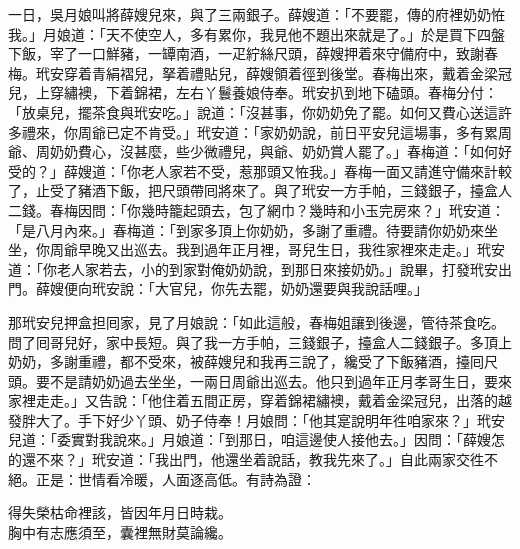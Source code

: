 一日，吳月娘叫將薛嫂兒來，與了三兩銀子。{}薛嫂道：「不要罷，傳的府裡奶奶恠我。」月娘道：「天不使空人，多有累你，我見他不題出來就是了。」於是買下四盤下飯，宰了一口鮮豬，一罈南酒，一疋紵絲尺頭，薛嫂押着來守備府中，致謝春梅。玳安穿着青絹褶兒，拏着禮貼兒，薛嫂領着徑到後堂。春梅出來，戴着金梁冠兒，上穿繡襖，下着錦裙，左右丫鬟養娘侍奉。玳安扒到地下磕頭。春梅分付：「放桌兒，擺茶食與玳安吃。」說道：「沒甚事，你奶奶免了罷。如何又費心送這許多禮來，你周爺已定不肯受。」玳安道：「家奶奶說，前日平安兒這場事，多有累周爺、周奶奶費心，沒甚麼，些少微禮兒，與爺、奶奶賞人罷了。」春梅道：「如何好受的？」薛嫂道：「你老人家若不受，惹那頭又恠我。」春梅一面又請進守備來計較了，止受了豬酒下飯，把尺頭帶囘將來了。與了玳安一方手帕，三錢銀子，擡盒人二錢。春梅因問：「你幾時籠起頭去，包了網巾？幾時和小玉完房來？」{}玳安道：「是八月內來。」春梅道：「到家多頂上你奶奶，多謝了重禮。待要請你奶奶來坐坐，你周爺早晚又出巡去。我到過年正月裡，哥兒生日，我徃家裡來走走。」玳安道：「你老人家若去，小的到家對俺奶奶說，到那日來接奶奶。」說畢，打發玳安出門。薛嫂便向玳安說：「大官兒，你先去罷，奶奶還要與我說話哩。」

那玳安兒押盒担囘家，見了月娘說：「如此這般，春梅姐讓到後邊，管待茶食吃。問了囘哥兒好，家中長短。與了我一方手帕，三錢銀子，擡盒人二錢銀子。多頂上奶奶，多謝重禮，都不受來，被薛嫂兒和我再三說了，纔受了下飯豬酒，擡囘尺頭。要不是請奶奶過去坐坐，一兩日周爺出巡去。他只到過年正月孝哥生日，要來家裡走走。」又告說：「他住着五間正房，穿着錦裙繡襖，戴着金梁冠兒，出落的越發胖大了。手下好少丫頭、奶子侍奉！月娘問：「他其寔說明年徃咱家來？」{}玳安兒道：「委實對我說來。」月娘道：「到那日，咱這邊使人接他去。」因問：「薛嫂怎的還不來？」玳安道：「我出門，他還坐着說話，教我先來了。」自此兩家交徃不絕。正是：世情看冷暖，人面逐高低。有詩為證：

\begin{myquote}
得失榮枯命裡該，皆因年月日時栽。\\胸中有志應須至，囊裡無財莫論纔。
\end{myquote}

